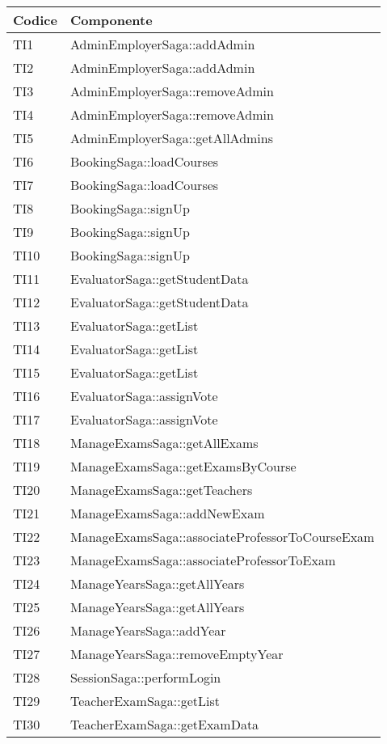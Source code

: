 \documentclass[PianoDiQualifica.tex]{subfiles}
\begin{document}
\begin{longtable}[H]{P{2cm}P{11.5cm}}
	\color{CHeaderText}\textbf{Codice} & 
	\color{CHeaderText}\textbf{Componente} \\
	\endhead
	TI1 & AdminEmployerSaga::addAdmin \\
	TI2 & AdminEmployerSaga::addAdmin \\
	TI3 & AdminEmployerSaga::removeAdmin \\
	TI4 & AdminEmployerSaga::removeAdmin \\
	TI5 & AdminEmployerSaga::getAllAdmins \\
	TI6 & BookingSaga::loadCourses \\
	TI7 & BookingSaga::loadCourses \\
	TI8 & BookingSaga::signUp \\
	TI9 & BookingSaga::signUp \\
	TI10 & BookingSaga::signUp \\
	TI11 & EvaluatorSaga::getStudentData \\
	TI12 & EvaluatorSaga::getStudentData \\
	TI13 & EvaluatorSaga::getList \\
	TI14 & EvaluatorSaga::getList \\
	TI15 & EvaluatorSaga::getList \\
	TI16 & EvaluatorSaga::assignVote \\
	TI17 & EvaluatorSaga::assignVote \\
	TI18 & ManageExamsSaga::getAllExams \\
	TI19 & ManageExamsSaga::getExamsByCourse \\
	TI20 & ManageExamsSaga::getTeachers \\
	TI21 & ManageExamsSaga::addNewExam \\
	TI22 & ManageExamsSaga::associateProfessorToCourseExam \\
	TI23 & ManageExamsSaga::associateProfessorToExam \\
	TI24 & ManageYearsSaga::getAllYears \\
	TI25 & ManageYearsSaga::getAllYears \\
	TI26 & ManageYearsSaga::addYear \\
	TI27 & ManageYearsSaga::removeEmptyYear \\
	TI28 & SessionSaga::performLogin \\
	TI29 & TeacherExamSaga::getList \\
	TI30 & TeacherExamSaga::getExamData \\

\end{longtable}
\end{document}
